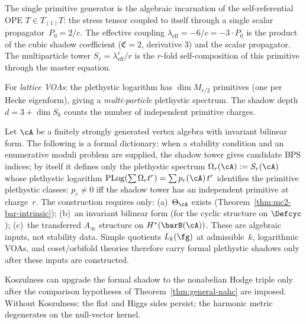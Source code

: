 \begin{remark}
\label{rem:bps-self-referential}
The single primitive generator is the algebraic incarnation
of the self-referential OPE $T \in T_{(1)}T$: the stress
tensor coupled to itself through a single scalar propagator~$P_0 = 2/c$.
The effective coupling $\lambda_{\mathrm{eff}} = -6/c
= -3 \cdot P_0$ is the product of the cubic shadow coefficient
($\mathfrak{C} = 2$, derivative $3$) and the scalar propagator.
The multiparticle tower $S_r = \lambda_{\mathrm{eff}}^r/r$ is
the $r$-fold self-composition of this primitive through the
master equation.

For \emph{lattice VOAs}: the plethystic logarithm has
$\dim M_{r/2}$ primitives (one per Hecke eigenform), giving
a \emph{multi-particle} plethystic spectrum. The shadow depth
$d = 3 + \dim S_k$ counts the number of independent primitive
charges.
\end{remark}

\begin{theorem}
\label{thm:general-bps}
\ClaimStatusConditional
{}
Let $\cA$ be a finitely strongly generated vertex algebra with
invariant bilinear form. The following is a formal dictionary:
when a stability condition and an enumerative moduli problem are
supplied, the shadow tower gives candidate BPS indices; by itself it
defines only the plethystic spectrum
$\Omega_r(\cA) := S_r(\cA)$ whose plethystic logarithm
$\operatorname{PLog}(\sum \Omega_r t^r) = \sum p_r(\cA)\,t^r$
identifies the primitive plethystic classes: $p_r \neq 0$ iff the shadow
tower has an independent primitive at charge~$r$. The
construction requires only:
\textup{(a)}~$\Theta_\cA$ exists
\textup{(}Theorem~\textup{\ref{thm:mc2-bar-intrinsic}}\textup{)};
\textup{(b)}~an invariant bilinear form \textup{(}for the cyclic
structure on $\Defcyc$\textup{)};
\textup{(c)}~the transferred $A_\infty$ structure on
$H^*(\barB(\cA))$.
These are algebraic inputs, not stability data.
Simple quotients $L_k(\fg)$ at admissible~$k$, logarithmic VOAs,
and coset/orbifold theories therefore carry formal plethystic
shadows only after these inputs are constructed.

Koszulness can upgrade the formal shadow to the nonabelian Hodge
triple only after the comparison hypotheses of
Theorem~\textup{\ref{thm:general-nahc}} are imposed.
Without Koszulness: the flat and Higgs sides persist; the harmonic
metric degenerates on the null-vector kernel.
\end{theorem}

